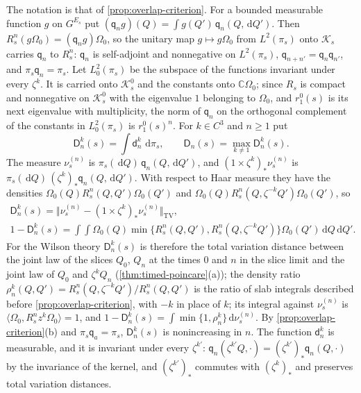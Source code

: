 \documentclass[11pt,a4paper]{amsart}
\theoremstyle{definition}
\theoremstyle{remark}
\numberwithin{equation}{section}
\newcommand{\C}{\mathbb{C}}          %
\newcommand{\Kspace}{\mathcal{K}}    %
\newcommand{\ip}[2]{\langle #1,#2\rangle}  %
\newcommand{\dd}{\,\mathrm{d}}             %
\newcommand{\Omegazero}{\Omega_0}          %
\begin{document}
The notation is that of \cref{prop:overlap-criterion}. For a bounded measurable function $g$ on $G^{E_s}$ put $(\mathsf q_ng)(Q)=\int g(Q')\,\mathsf q_n(Q,\dd Q')$. Then $R_s^n(g\Omegazero)=(\mathsf q_ng)\Omegazero$, so the unitary map $g\mapsto g\Omegazero$ from $L^2(\pi_s)$ onto $\Kspace_s$ carries $\mathsf q_n$ to $R_s^n$: $\mathsf q_n$ is self-adjoint and nonnegative on $L^2(\pi_s)$, $\mathsf q_{n+n'}=\mathsf q_n\mathsf q_{n'}$, and $\pi_s\mathsf q_n=\pi_s$. Let $L^2_0(\pi_s)$ be the subspace of the functions invariant under every $\zeta^k$. It is carried onto $\Kspace^0_s$ and the constants onto $\C\Omegazero$; since $R_s$ is compact and nonnegative on $\Kspace^0_s$ with the eigenvalue $1$ belonging to $\Omegazero$, and $r_1^0(s)$ is its next eigenvalue with multiplicity, the norm of $\mathsf q_n$ on the orthogonal complement of the constants in $L^2_0(\pi_s)$ is $r_1^0(s)^n$. For $k\in C^3$ and $n\ge1$ put
\[
\mathsf D^k_n(s)=\int\mathsf d^k_n\,\dd\pi_s,\qquad \mathsf D_n(s)=\max_{k\ne1}\mathsf D^k_n(s).
\]
The measure $\nu^{(n)}_s$ is $\pi_s(\dd Q)\,\mathsf q_n(Q,\dd Q')$, and $(1\times\zeta^k)_*\nu^{(n)}_s$ is $\pi_s(\dd Q)\,(\zeta^k)_*\mathsf q_n(Q,\dd Q')$. With respect to Haar measure they have the densities $\Omegazero(Q)R_s^n(Q,Q')\Omegazero(Q')$ and $\Omegazero(Q)R_s^n(Q,\zeta^{-k}Q')\Omegazero(Q')$, so
\begin{gather*}
\mathsf D^k_n(s)=\bigl\Vert\nu^{(n)}_s-(1\times\zeta^k)_*\nu^{(n)}_s\bigr\Vert_{\mathrm{TV}},\\
1-\mathsf D^k_n(s)=\int\!\!\int\Omegazero(Q)\min\bigl\{R_s^n(Q,Q'),R_s^n(Q,\zeta^{-k}Q')\bigr\}\Omegazero(Q')\dd Q\dd Q' .
\end{gather*}
For the Wilson theory $\mathsf D^k_n(s)$ is therefore the total variation distance between the joint law of the slices $Q_0$, $Q_n$ at the times $0$ and $n$ in the slice limit and the joint law of $Q_0$ and $\zeta^kQ_n$ (\cref{thm:timed-poincare}(a)); the density ratio $\rho^k_n(Q,Q')=R_s^n(Q,\zeta^{-k}Q')/R_s^n(Q,Q')$ is the ratio of slab integrals described before \cref{prop:overlap-criterion}, with $-k$ in place of $k$; its integral against $\nu^{(n)}_s$ is $\ip{\Omegazero}{R_s^nz^{k}\Omegazero}=1$, and $1-\mathsf D^k_n(s)=\int\min\{1,\rho^k_n\}\dd\nu^{(n)}_s$. By \cref{prop:overlap-criterion}(b) and $\pi_s\mathsf q_a=\pi_s$, $\mathsf D^k_n(s)$ is nonincreasing in $n$. The function $\mathsf d^k_n$ is measurable, and it is invariant under every $\zeta^{k'}$: $\mathsf q_n(\zeta^{k'}Q,\cdot)=(\zeta^{k'})_*\mathsf q_n(Q,\cdot)$ by the invariance of the kernel, and $(\zeta^{k'})_*$ commutes with $(\zeta^k)_*$ and preserves total variation distances.
\end{document}
